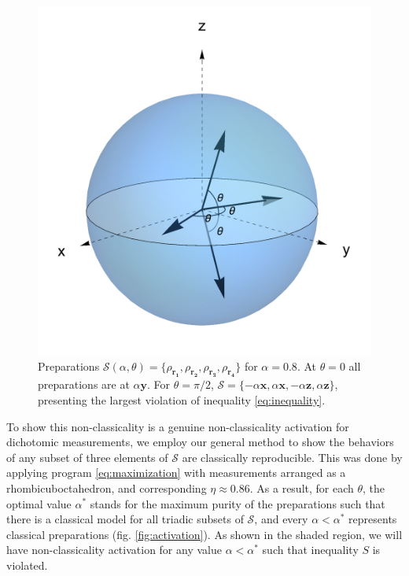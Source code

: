 \documentclass[a4paper,preprintnumbers,floatfix,superscriptaddress,pra,twocolumn,showpacs,notitlepage,longbibliography]{revtex4-2}
\begin{document}
        \begin{figure}
            \centering
            \includegraphics[width=.8\columnwidth]{preparation-states.png}
            \caption{Preparations $\mathcal{S}(\alpha, \theta) = \{ \rho_{\bm{r_1}}, \rho_{\bm{r_2}}, \rho_{\bm{r_3}}, \rho_{\bm{r_4}} \}$ for $\alpha=0.8$. At $\theta=0$ all preparations are at $\alpha \bm{y}$. For $\theta = \pi/2$, $\mathcal{S} =  \{ -\alpha\bm{x}, \alpha\bm{x}, -\alpha\bm{z}, \alpha\bm{z} \}$, presenting the largest violation of inequality \eqref{eq:inequality}.}
            \label{fig:preparations}
        \end{figure}
        
        To show this non-classicality is a genuine non-classicality activation for dichotomic measurements, we employ our general method to show the behaviors of any subset of three elements of $\mathcal{S}$ are classically reproducible. This was done by applying program \eqref{eq:maximization} with measurements arranged as a rhombicuboctahedron, and corresponding $\eta \approx 0.86$. As a result, for each $\theta$, the optimal value $\alpha^*$ stands for the maximum purity of the preparations such that there is a classical model for all triadic subsets of $\mathcal{S}$, and every $\alpha < \alpha^*$ represents classical preparations (fig. \ref{fig:activation}). As shown in the shaded region, we will have non-classicality activation for any value $\alpha < \alpha^*$ such that inequality $S$ is violated.
        
    
        
\end{document}
